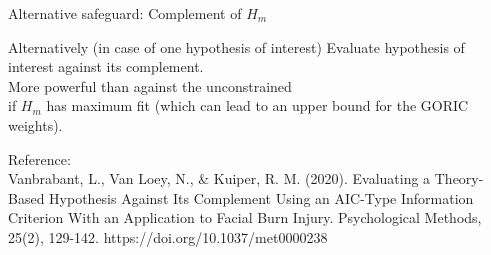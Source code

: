 \documentclass[10pt]{beamer}\usepackage[]{graphicx}\usepackage[]{xcolor}
\begin{document}
\begin{frame}{Alternative safeguard: Complement of $H_m$}%
	
	\begin{block}{Alternatively (in case of one hypothesis of interest)}
		Evaluate hypothesis of interest against its complement.\\
		\vspace{\baselineskip}
		More powerful than against the unconstrained \\
		if $H_m$ has maximum fit (which can lead to an upper bound for the GORIC weights).
	\end{block}
	
	\vspace{\baselineskip}
	
	\footnotesize{
		Reference:\\
		Vanbrabant, L., Van Loey, N., \& Kuiper, R. M. (2020). Evaluating a Theory-Based Hypothesis Against Its Complement Using an AIC-Type Information Criterion With an Application to Facial Burn Injury. Psychological Methods, 25(2), 129-142. https://doi.org/10.1037/met0000238
	}
\end{frame}
%
\end{document}
